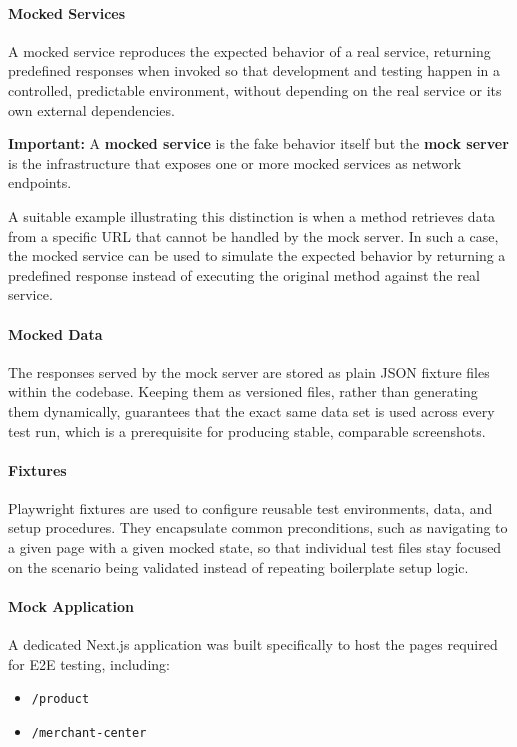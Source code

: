 \paragraph{Mocked Services} A mocked service reproduces the expected behavior of a real service, returning predefined responses when invoked so that development and testing happen in a controlled, predictable environment, without depending on the real service or its own external dependencies.
 
\textbf{Important:} A \textbf{mocked service} is the fake behavior itself but the \textbf{mock server} is the infrastructure that exposes one or more mocked services as network endpoints.

A suitable example illustrating this distinction is when a method retrieves data from a specific URL that cannot be handled by the mock server. In such a case, the mocked service can be used to simulate the expected behavior by returning a predefined response instead of executing the original method against the real service.
 
\paragraph{Mocked Data} The responses served by the mock server are stored as plain JSON fixture files within the codebase. Keeping them as versioned files, rather than generating them dynamically, guarantees that the exact same data set is used across every test run, which is a prerequisite for producing stable, comparable screenshots.
 
\paragraph{Fixtures} Playwright fixtures are used to configure reusable test environments, data, and setup procedures. They encapsulate common preconditions, such as navigating to a given page with a given mocked state, so that individual test files stay focused on the scenario being validated instead of repeating boilerplate setup logic.
 
\paragraph{Mock Application} A dedicated Next.js application was built specifically to host the pages required for \ac{E2E} testing, including:
 
\begin{itemize}
    \item \texttt{/product}
    \item \texttt{/merchant-center}
\end{itemize}
 
